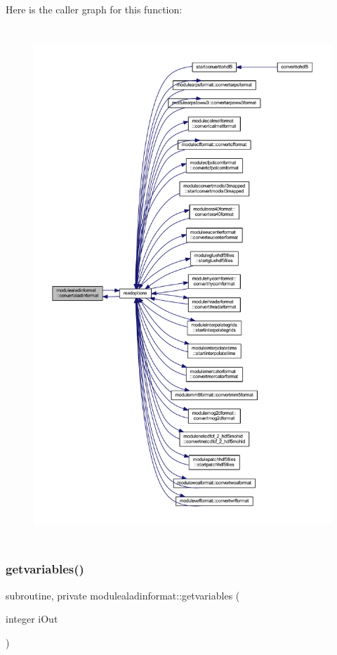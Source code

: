 Here is the caller graph for this function\+:\nopagebreak
\begin{figure}[H]
\begin{center}
\leavevmode
\includegraphics[height=550pt]{namespacemodulealadinformat_a77f6d15bb472ac521ff23ef7a54a48e7_icgraph}
\end{center}
\end{figure}
\mbox{\label{namespacemodulealadinformat_ac871ced2e3713912a0c9a9563bbab1cb}} 
\subsubsection{\texorpdfstring{getvariables()}{getvariables()}}
{\footnotesize\ttfamily subroutine, private modulealadinformat\+::getvariables (\begin{DoxyParamCaption}\item[{integer}]{i\+Out }\end{DoxyParamCaption})\hspace{0.3cm}{\ttfamily [private]}}

